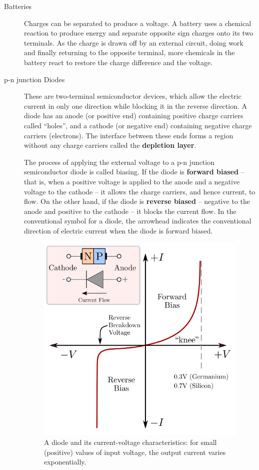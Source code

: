 \begin{description}
\item[Batteries]

Charges can be separated to produce a voltage. A battery uses a chemical reaction to produce energy and separate opposite sign charges onto its two terminals. As the charge is drawn off by an external circuit, doing work and finally returning to the opposite terminal, more chemicals in the battery react to restore the charge difference and the voltage.


\item[p-n junction Diodes]

These are two-terminal semiconductor devices, which allow the electric current in only one direction while blocking it in the reverse direction. A diode has an anode (or positive end) containing positive charge carriers called ``holes'', and a cathode (or negative end) containing negative charge carriers (electrons). The interface between these ends forms a region without any charge carriers called the \textbf{depletion layer}. 

The process of applying the external voltage to a p-n junction semiconductor diode is called biasing. If the diode is \textbf{forward biased} -- that is, when a positive voltage is applied to the anode and a negative voltage to the cathode -- it allows the charge carriers, and hence current, to flow. On the other hand, if the diode is \textbf{reverse biased} -- negative to the anode and positive to the cathode -- it blocks the current flow. In the conventional symbol for a diode, the arrowhead indicates the conventional direction of electric current when the diode is forward biased.

\begin{figure}[!htb]
\centering
\includegraphics[scale=0.4]{figs/diode_characteristics.png}
\caption{A diode and its current-voltage characteristics: for small (positive) values of input voltage, the output current varies exponentially.}
\label{fig:diodeChar}
\end{figure}


\end{description}
